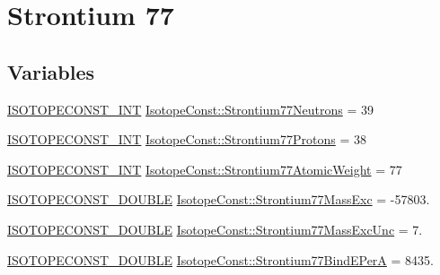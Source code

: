 \hypertarget{group___isotope_const-_strontium-_sr77}{}\section{Strontium 77}
\label{group___isotope_const-_strontium-_sr77}
\subsection*{Variables}
\begin{DoxyCompactItemize}
\item 
\mbox{\hyperlink{group___isotope_const-_macros_ga5f18360b3e99483a35c32d789e62621c}{I\+S\+O\+T\+O\+P\+E\+C\+O\+N\+S\+T\+\_\+\+I\+NT}} \mbox{\hyperlink{group___isotope_const-_strontium-_sr77_ga5b46df388dad19bc52711d429bc7f3b1}{Isotope\+Const\+::\+Strontium77\+Neutrons}} = 39
\item 
\mbox{\hyperlink{group___isotope_const-_macros_ga5f18360b3e99483a35c32d789e62621c}{I\+S\+O\+T\+O\+P\+E\+C\+O\+N\+S\+T\+\_\+\+I\+NT}} \mbox{\hyperlink{group___isotope_const-_strontium-_sr77_ga9063cd725807e9bb16f183de2458d1ba}{Isotope\+Const\+::\+Strontium77\+Protons}} = 38
\item 
\mbox{\hyperlink{group___isotope_const-_macros_ga5f18360b3e99483a35c32d789e62621c}{I\+S\+O\+T\+O\+P\+E\+C\+O\+N\+S\+T\+\_\+\+I\+NT}} \mbox{\hyperlink{group___isotope_const-_strontium-_sr77_gaa3213026ffcc31fc3fc2fd66a7fef800}{Isotope\+Const\+::\+Strontium77\+Atomic\+Weight}} = 77
\item 
\mbox{\hyperlink{group___isotope_const-_macros_ga8f45a7272ce02c0b4c65c44636ed719a}{I\+S\+O\+T\+O\+P\+E\+C\+O\+N\+S\+T\+\_\+\+D\+O\+U\+B\+LE}} \mbox{\hyperlink{group___isotope_const-_strontium-_sr77_gab59d163cbb990fb49c4058a5b5e5e6c3}{Isotope\+Const\+::\+Strontium77\+Mass\+Exc}} = -\/57803.
\item 
\mbox{\hyperlink{group___isotope_const-_macros_ga8f45a7272ce02c0b4c65c44636ed719a}{I\+S\+O\+T\+O\+P\+E\+C\+O\+N\+S\+T\+\_\+\+D\+O\+U\+B\+LE}} \mbox{\hyperlink{group___isotope_const-_strontium-_sr77_gae5098521090df0bd9eaf1a82b6cef756}{Isotope\+Const\+::\+Strontium77\+Mass\+Exc\+Unc}} = 7.
\item 
\mbox{\hyperlink{group___isotope_const-_macros_ga8f45a7272ce02c0b4c65c44636ed719a}{I\+S\+O\+T\+O\+P\+E\+C\+O\+N\+S\+T\+\_\+\+D\+O\+U\+B\+LE}} \mbox{\hyperlink{group___isotope_const-_strontium-_sr77_ga5d24d26fa961e0cc1d60a00052ce170d}{Isotope\+Const\+::\+Strontium77\+Bind\+E\+PerA}} = 8435.
\item 

\end{DoxyCompactItemize}
